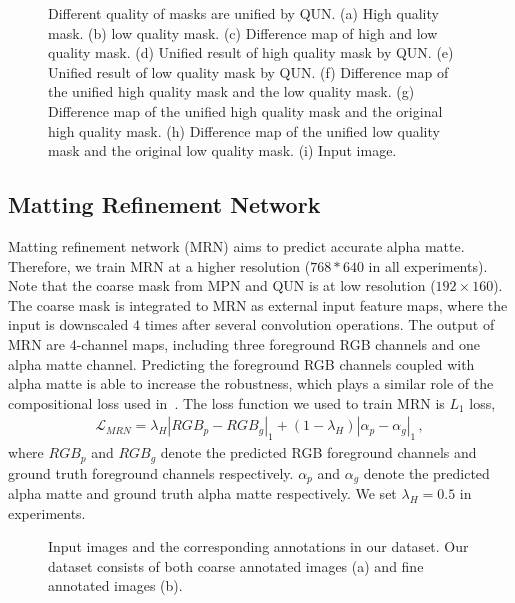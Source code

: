 \documentclass[10pt,twocolumn,letterpaper]{article}
\begin{document}
\begin{figure}[t]
  \centering
  \caption{Different quality of masks are unified by QUN. (a) High quality mask. (b) low quality mask. (c) Difference map of high and low quality mask. (d) Unified result of high quality mask by QUN. (e) Unified result of low quality mask by QUN. (f) Difference map of the unified high quality mask and the low quality mask. (g) Difference map of the unified high quality mask and the original high quality mask. (h) Difference map of the unified low quality mask and the original low quality mask. (i) Input image. }
  \label{fig:demo_mqun}
\end{figure}

\subsection{Matting Refinement Network}
Matting refinement network (MRN) aims to predict accurate alpha matte. Therefore, we train MRN at a higher resolution ($768*640$ in all experiments). Note that the coarse mask from MPN and QUN is at low resolution ($192\times 160$). The coarse mask is integrated to MRN as external input feature maps, where the input is downscaled $4$ times after several convolution operations. The output of MRN are 4-channel maps, including three foreground RGB channels and one alpha matte channel. Predicting the foreground RGB channels coupled with alpha matte is able to increase the robustness, which plays a similar role of the compositional loss used in~\cite{xu2017deep,chen2018semantic}. The loss function we used to train MRN is $L_1$ loss,
\begin{equation}
\begin{aligned}
\label{eq:hrn_loss}
\mathcal{L}_{MRN}=\lambda_H|{RGB}_p-{RGB}_g|_1+(1-\lambda_H)|\alpha_p-\alpha_g|_1\,,
\end{aligned}
\end{equation}
where ${RGB}_p$ and ${RGB}_g$ denote the predicted RGB foreground channels and ground truth foreground channels respectively. $\alpha_p$ and $\alpha_g$ denote the predicted alpha matte and ground truth alpha matte respectively. We set $\lambda_H=0.5$ in experiments.


\begin{figure}[t]
  \centering
  \caption{Input images and the corresponding annotations in our dataset. Our dataset consists of both coarse annotated images (a) and fine annotated images (b).}
  \label{fig: dataset}
\end{figure}
\end{document}
